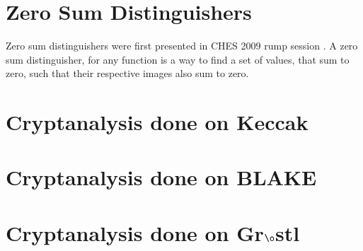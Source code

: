\section{Zero Sum Distinguishers}
Zero sum distinguishers were first presented in CHES 2009 rump session \cite{00014}. A zero sum distinguisher, for any
function is a way to find a set of values, that sum to zero, such that their respective images also sum to zero.

\section{Cryptanalysis done on Keccak}
\section{Cryptanalysis done on BLAKE}
\section{Cryptanalysis done on Gr$\o$stl}
